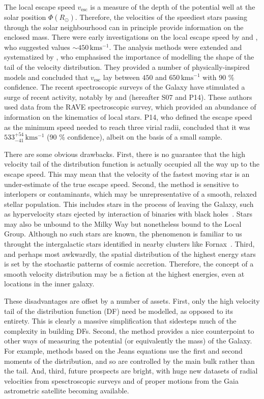 \documentclass[useAMS,twocolumn,usenatbib]{mn2e}
\def\kms{{\,\mathrm{kms^{-1}}}}
\def\vesc{{v_\mathrm{esc}}}
\begin{document}
The local escape speed $\vesc$ is a measure of the depth of the
potential well at the solar position $\Phi(R_\odot)$. Therefore, the
velocities of the speediest stars passing through the solar
neighbourhood can in principle provide information on the enclosed
mass. There were early investigations on the local escape speed by
\citet{Ca81} and \citet{Al82}, who suggested values $\sim 450\kms$.
The analysis methods were extended and systematized by \citet{Le90},
who emphasised the importance of modelling the shape of the tail of
the velocity distribution. They provided a number of
physically-inspired models and concluded that $\vesc$ lay between
$450$ and $650 \kms$ with 90 \% confidence. The recent spectroscopic
surveys of the Galaxy have stimulated a surge of recent activity,
notably by \cite{Sm07} and \cite{Pi14} (hereafter S07 and P14). These
authors used data from the RAVE spectroscopic survey, which provided
an abundance of information on the kinematics of local stars. P14, who
defined the escape speed as the minimum speed needed to reach three
virial radii, concluded that it was $533^{+54}_{-41} \kms$ (90 \%
confidence), albeit on the basis of a small sample.

There are some obvious drawbacks. First, there is no guarantee that
the high velocity tail of the distribution function is actually
occupied all the way up to the escape speed. This may mean that the
velocity of the fastest moving star is an under-estimate of the true
escape speed. Second, the method is sensitive to interlopers or
contaminants, which may be unrepresentative of a smooth, relaxed
stellar population. This includes stars in the process of leaving the
Galaxy, such as hypervelocity stars ejected by interaction of binaries
with black holes~\citep[e.g.,][]{Br15,Bou16}. Stars may also be
unbound to the Milky Way but nonetheless bound to the Local
Group. Although no such stars are known, the phenomenon is familiar to
us throught the intergalactic stars identified in nearby clusters like
Fornax~\citep{Th97}. Third, and perhaps most awkwardly, the spatial
distribution of the highest energy stars is set by the stochastic
patterns of cosmic accretion. Therefore, the concept of a smooth
velocity distribution may be a fiction at the highest energies, even
at locations in the inner galaxy.

These disadvantages are offset by a number of assets. First, only the
high velocity tail of the distribution function (DF) need be modelled,
as opposed to its entirety. This is clearly a massive simplification
that sidesteps much of the complexity in building DFs. Second, the
method provides a nice counterpoint to other ways of measuring the
potential (or equivalently the mass) of the Galaxy. For example,
methods based on the Jeans equations use the first and second moments
of the distribution, and so are controlled by the main bulk rather
than the tail. And, third, future prospects are bright, with huge new
datasets of radial velocities from spesctroscopic surveys and of
proper motions from the Gaia astrometric satellite becoming available.
\end{document}

